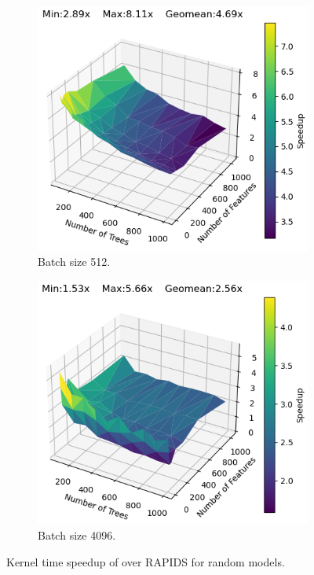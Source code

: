 \begin{figure}[htb]
  \begin{subfigure}[t]{.475\linewidth}
    \includegraphics[width=\linewidth]{figures/RandomModels/kernel_speedup_b512_depth8.png}
    \caption{Batch size 512.}
  \end{subfigure}
  \begin{subfigure}[t]{.475\linewidth}
    \includegraphics[width=\linewidth]{figures/RandomModels/kernel_speedup_b4096_depth6.png}
    \caption{Batch size 4096.}
  \end{subfigure}
  \caption{\label{fig:randomModels4060}Kernel time speedup of \Treebeard{} over RAPIDS for random models.
  }
\end{figure}

